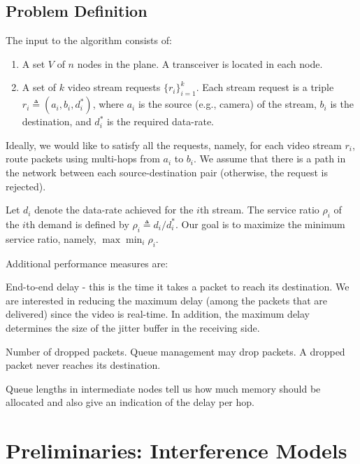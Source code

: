 \documentclass[12pt,oneside,english,a4paper]{book}
\theoremstyle{plain}
\theoremstyle{definition}
\theoremstyle{Theorem}
\theoremstyle{plain}
\newenvironment{proof sketch}[1]{\noindent {\emph{Proof sketch of #1:}}}{\hfill \qed}
\newcommand{\eqdf}{\triangleq}
\begin{document}
\section{Problem Definition}
The input to the algorithm consists of:
\begin{enumerate}
\item A set $V$ of $n$ nodes in the plane. A transceiver is located in
  each node.
\item A set of $k$ video stream requests $\{r_i\}_{i=1}^k$. Each
  stream request is a triple $r_i\eqdf (a_i,b_i,d^*_i)$, where $a_i$ is
  the source (e.g., camera) of the stream, $b_i$ is the destination,
  and $d^*_i$ is the required data-rate.
\end{enumerate}
Ideally, we would like to satisfy all the requests, namely, for each
video stream $r_i$, route packets using multi-hops from $a_i$ to $b_i$.
We assume that there is a path in the network between each
source-destination pair (otherwise, the request is rejected).

Let $d_i$ denote the data-rate achieved for the $i$th stream.  The
service ratio $\rho_i$ of the $i$th demand is defined by $\rho_i \eqdf
d_i/d^*_i$.  Our goal is to maximize the minimum service ratio,
namely, $\max \min_i \rho_i$.

Additional performance measures are:
\begin{inparaenum}[(i)]
\item End-to-end delay - this is the time it takes a packet to reach
  its destination. We are interested in reducing the maximum delay
  (among the packets that are delivered) since the video is real-time.
  In addition, the maximum delay determines the size of the jitter
  buffer in the receiving side.
\item Number of dropped packets. Queue management may drop packets. A dropped packet
never reaches its destination.
\item Queue lengths in intermediate nodes tell us how much memory
  should be allocated and also give an indication of the delay per hop.
\end{inparaenum}

\chapter{Preliminaries: Interference Models}
\label{sec:prelim}\label{sec:models}

\end{document}
